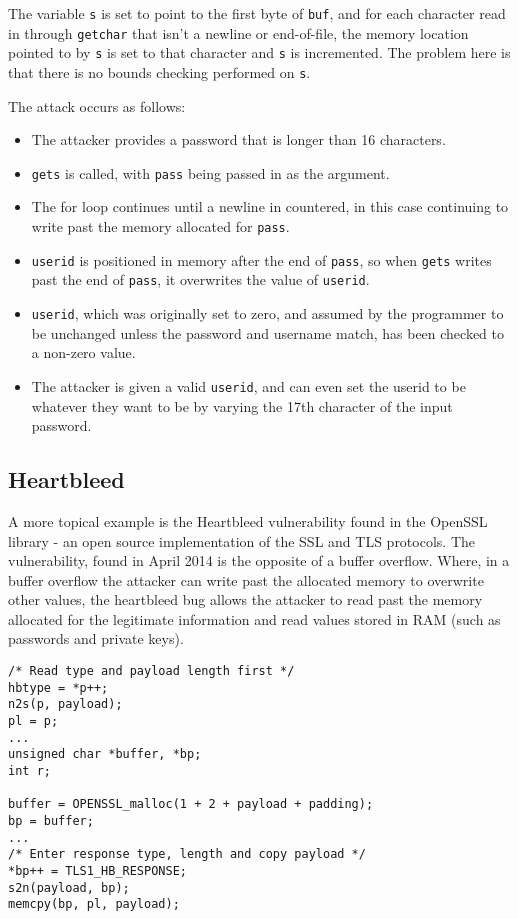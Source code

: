 The variable \verb!s! is set to point to the first byte of \verb!buf!, and for each character read in through \verb!getchar! that isn't a newline or end-of-file, the memory location pointed to by \verb!s! is set to that character and \verb!s! is incremented.
The problem here is that there is no bounds checking performed on \verb!s!.

The attack occurs as follows:

\begin{itemize}
\item The attacker provides a password that is longer than 16 characters.
\item \verb!gets! is called, with \verb!pass! being passed in as the argument.
\item The for loop continues until a newline in countered, in this case continuing to write past the memory allocated for \verb!pass!.
\item \verb!userid! is positioned in memory after the end of \verb!pass!, so when \verb!gets! writes past the end of \verb!pass!, it overwrites the value of \verb!userid!.
\item \verb!userid!, which was originally set to zero, and assumed by the programmer to be unchanged unless the password and username match, has been checked to a non-zero value.
\item The attacker is given a valid \verb!userid!, and can even set the userid to be whatever they want to be by varying the 17th character of the input password.
\end{itemize}

\subsection{Heartbleed}

A more topical example is the Heartbleed vulnerability found in the OpenSSL library - an open source implementation of the SSL and TLS protocols.
The vulnerability, found in April 2014 is the opposite of a buffer overflow.
Where, in a buffer overflow the attacker can write past the allocated memory to overwrite other values, the heartbleed bug allows the attacker to read past the memory allocated for the legitimate information and read values stored in RAM (such as passwords and private keys).


\begin{verbatim}
/* Read type and payload length first */
hbtype = *p++;
n2s(p, payload);
pl = p;
...
unsigned char *buffer, *bp;
int r;

buffer = OPENSSL_malloc(1 + 2 + payload + padding);
bp = buffer;
...
/* Enter response type, length and copy payload */
*bp++ = TLS1_HB_RESPONSE;
s2n(payload, bp);
memcpy(bp, pl, payload);
\end{verbatim}

